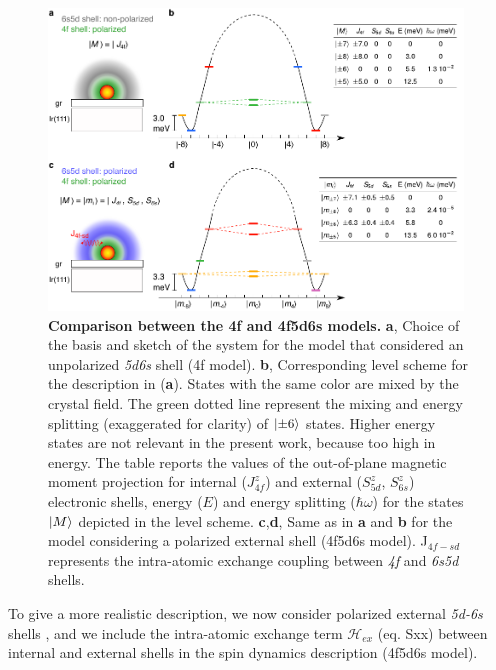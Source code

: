 \documentclass[
reprint,amsmath,amssymb,aps]{revtex4-2}
\begin{document}
\begin{figure}[ht!]
\includegraphics[width=0.98\textwidth]{Fig1_new.pdf}
\caption{\textbf{Comparison between the 4f and 4f5d6s models.} \textbf{a}, Choice of the basis and sketch of the system for the model that considered an unpolarized \textit{5d6s} shell (4f model). \textbf{b}, Corresponding level scheme for the description in (\textbf{a}). States with the same color are mixed by the crystal field. The green dotted line represent the mixing and energy splitting (exaggerated for clarity) of $\ket{\pm6}$ states. Higher energy states are not relevant in the present work, because too high in energy.  The table reports the values of the out-of-plane magnetic moment projection for internal ($J_{4f}^z$) and external ($S^z_{5d}$, $S^z_{6s}$)  electronic shells, energy ($E$) and energy splitting ($\hbar\omega$) for the states $\ket{M}$ depicted in the level scheme. \textbf{c},\textbf{d}, Same as in \textbf{a} and \textbf{b} for the model considering a polarized external shell (4f5d6s model). J$_{4f-sd}$ represents the intra-atomic exchange coupling between \textit{4f} and \textit{6s5d} shells.
\label{fig:intra} }
\end{figure}

To give a more realistic description, we now consider polarized external \textit{5d-6s} shells \cite{pivettaMeasuringIntraAtomicExchange2020}, and we include the intra-atomic exchange term $\mathcal{H}_{ex}$ (eq. Sxx) between internal and external shells in the spin dynamics description (4f5d6s model). 
\end{document}
